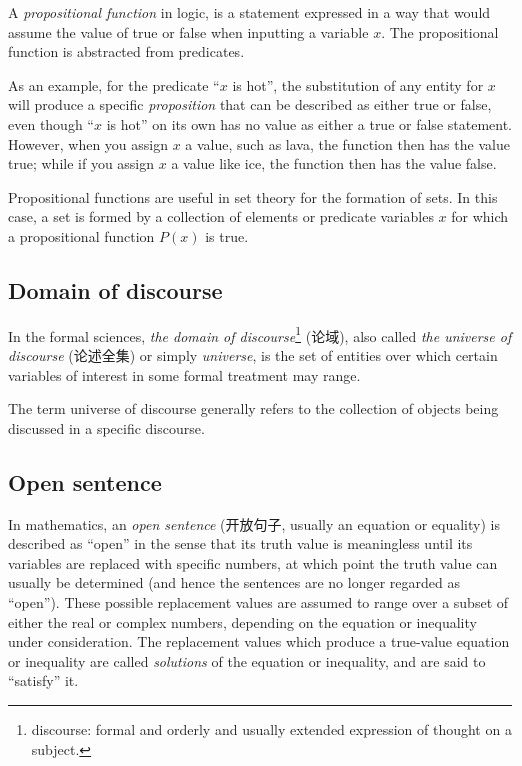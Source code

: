 \documentclass{book}
\numberwithin{equation}{section}
\numberwithin{figure}{section}
\theoremstyle{definition}
\newcommand{\dq}[1]{``#1''}
\begin{document}
A \emph{propositional function} in logic, is a statement expressed in a way that would assume the value of true or false when inputting a variable $x$. The propositional function is abstracted from predicates. 

As an example, for the predicate \dq{$x$ is hot}, the substitution of any entity for $x$ will produce a specific \emph{proposition} that can be described as either true or false, even though \dq{$x$ is hot} on its own has no value as either a true or false statement. However, when you assign $x$ a value, such as lava, the function then has the value true; while if you assign $x$ a value like ice, the function then has the value false.

Propositional functions are useful in set theory for the formation of sets.
In this case, a set is formed by a collection of elements or predicate variables $x$ for which a propositional function $P(x)$ is true.

\subsection{Domain of discourse}
In the formal sciences, \emph{the domain of discourse}\footnote{discourse: formal and orderly and usually extended expression of thought on a subject.} (论域), also called \emph{the universe of discourse} (论述全集) or simply \emph{universe}, is the set of entities over which certain variables of interest in some formal treatment may range. 

The term universe of discourse generally refers to the collection of objects being discussed in a specific discourse.

\subsection{Open sentence}
In mathematics, an \emph{open sentence} (开放句子, usually an equation or equality) is described as ``open'' in the sense that its truth value is meaningless until its variables are replaced with specific numbers, at which point the truth value can usually be determined (and hence the sentences are no longer regarded as ``open''). These possible replacement values are assumed to range over a subset of either the real or complex numbers, depending on the equation or inequality under consideration. The replacement values which produce a true-value equation or inequality are called \emph{solutions} of the equation or inequality, and are said to ``satisfy'' it.
\end{document}
